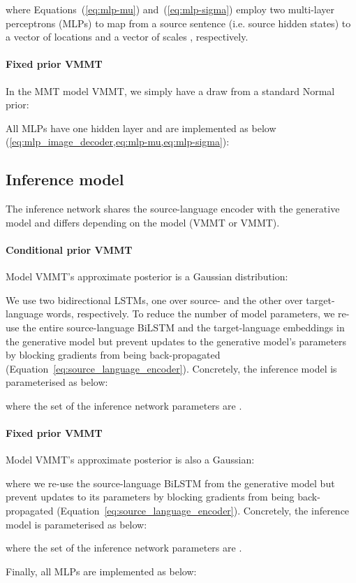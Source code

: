 \documentclass[11pt,a4paper]{article}
\newcommand{\cond}{VMMT\xspace}
\newcommand{\uncond}{VMMT\xspace}
\begin{document}
where Equations~(\ref{eq:mlp-mu}) and~(\ref{eq:mlp-sigma}) employ two multi-layer perceptrons (MLPs) to map from a source sentence (i.e. source hidden states) to a vector of locations  and a vector of scales , respectively.

\paragraph{Fixed prior \uncond}
In the MMT model \uncond, we simply have a draw from a standard Normal prior:



All MLPs have one hidden layer and are implemented as below (\cref{eq:mlp_image_decoder,eq:mlp-mu,eq:mlp-sigma}):





\subsection{Inference model}
The inference network shares the source-language encoder with the generative model and differs depending on the model (\cond or \uncond).








\paragraph{Conditional prior \cond}
Model \cond's approximate posterior  is a Gaussian distribution:

We use two bidirectional LSTMs, one over source- and the other over target-language words, respectively. To reduce the number of model parameters, we re-use the entire source-language BiLSTM and the target-language embeddings in the generative model but prevent updates to the generative model's parameters by blocking gradients from being back-propagated (Equation~\ref{eq:source_language_encoder}).
Concretely, the inference model is parameterised as below:

where the set of the inference network parameters are .

\paragraph{Fixed prior \uncond}
Model \uncond's approximate posterior  is also a Gaussian:

where we re-use the source-language BiLSTM from the generative model but prevent updates to its parameters by blocking gradients from being back-propagated (Equation~\ref{eq:source_language_encoder}).
Concretely, the inference model is parameterised as below:

where the set of the inference network parameters are .

Finally, all MLPs are implemented as below:
 
\end{document}
